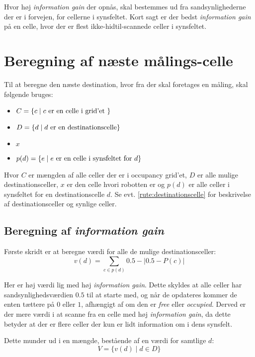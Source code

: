 Hvor høj \textit{information gain} der opnås, skal bestemmes ud fra sandsynlighederne der er i forvejen, for cellerne i synsfeltet.
Kort sagt er der bedst \textit{information gain} på en celle, hvor der er flest ikke-hidtil-scannede celler i synsfeltet.

\section{Beregning af næste målings-celle}
Til at beregne den næste destination, hvor fra der skal foretages en måling, skal følgende bruges:
\begin{itemize}
\item{$C = \{ c \mid c \textnormal{ er en celle i grid'et } \}$}
\item{$D = \{ d \mid d \textnormal{ er en destinationscelle}\}$}
\item{$x$}
\item{$p(d) = \{ e \mid e \textnormal{ er en celle i synsfeltet for } d \}$}
\end{itemize}
Hvor $C$ er mængden af alle celler der er i occupancy grid'et, $D$ er alle mulige destinationsceller, $x$ er den celle hvori robotten er og $p(d)$ er alle celler i synsfeltet for en destinationscelle $d$.
Se evt. \cref{rute:destinationscelle} for beskrivelse af destinationsceller og synlige celler.

\subsection{Beregning af \textit{information gain}}
Første skridt er at beregne værdi for alle de mulige destinationsceller:
\begin{equation}
v(d) = \sum_{c \in p(d)} 0.5-|0.5 - P(c)|
\end{equation}

Her er høj værdi lig med høj \textit{information gain}.
Dette skyldes at alle celler har sandsynlighedsværdien $0.5$ til at starte med, og når de opdateres kommer de enten tættere på $0$ eller $1$, afhængigt af om den er \textit{free} eller \textit{occupied}.
Derved er der mere værdi i at scanne fra en celle med høj \textit{information gain}, da dette betyder at der er flere celler der kun er lidt information om i dens synsfelt.

Dette munder ud i en mængde, bestående af en værdi for samtlige $d$:
\begin{equation}
V = \{ v(d) \mid d \in D \}
\end{equation}

